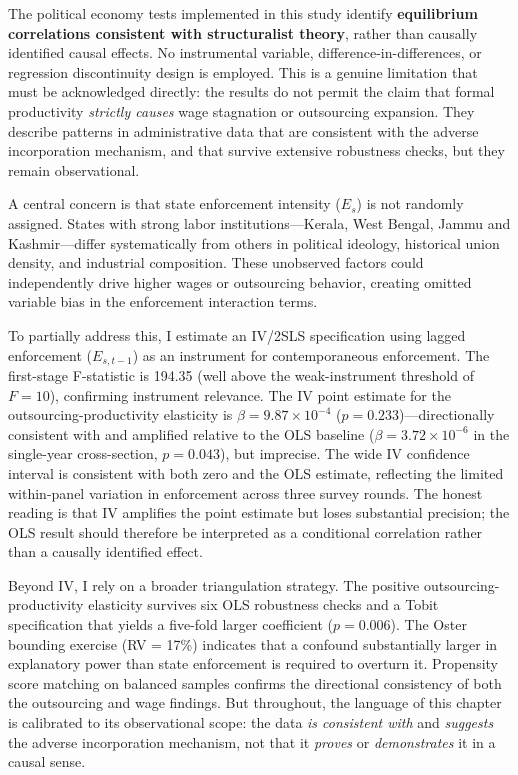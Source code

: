 The political economy tests implemented in this study identify \textbf{equilibrium correlations consistent with structuralist theory}, rather than causally identified causal effects. No instrumental variable, difference-in-differences, or regression discontinuity design is employed. This is a genuine limitation that must be acknowledged directly: the results do not permit the claim that formal productivity \textit{strictly causes} wage stagnation or outsourcing expansion. They describe patterns in administrative data that are consistent with the adverse incorporation mechanism, and that survive extensive robustness checks, but they remain observational.

A central concern is that state enforcement intensity ($E_s$) is not randomly assigned. States with strong labor institutions---Kerala, West Bengal, Jammu and Kashmir---differ systematically from others in political ideology, historical union density, and industrial composition. These unobserved factors could independently drive higher wages or outsourcing behavior, creating omitted variable bias in the enforcement interaction terms.

To partially address this, I estimate an IV/2SLS specification using lagged enforcement ($E_{s,t-1}$) as an instrument for contemporaneous enforcement. The first-stage F-statistic is 194.35 (well above the weak-instrument threshold of $F = 10$), confirming instrument relevance. The IV point estimate for the outsourcing-productivity elasticity is $\beta = 9.87 \times 10^{-4}$ ($p = 0.233$)---directionally consistent with and amplified relative to the OLS baseline ($\beta = 3.72 \times 10^{-6}$ in the single-year cross-section, $p = 0.043$), but imprecise. The wide IV confidence interval is consistent with both zero and the OLS estimate, reflecting the limited within-panel variation in enforcement across three survey rounds. The honest reading is that IV amplifies the point estimate but loses substantial precision; the OLS result should therefore be interpreted as a conditional correlation rather than a causally identified effect.

Beyond IV, I rely on a broader triangulation strategy. The positive outsourcing-productivity elasticity survives six OLS robustness checks and a Tobit specification that yields a five-fold larger coefficient ($p = 0.006$). The Oster bounding exercise (RV = 17\%) indicates that a confound substantially larger in explanatory power than state enforcement is required to overturn it. Propensity score matching on balanced samples confirms the directional consistency of both the outsourcing and wage findings. But throughout, the language of this chapter is calibrated to its observational scope: the data \textit{is consistent with} and \textit{suggests} the adverse incorporation mechanism, not that it \textit{proves} or \textit{demonstrates} it in a causal sense.

